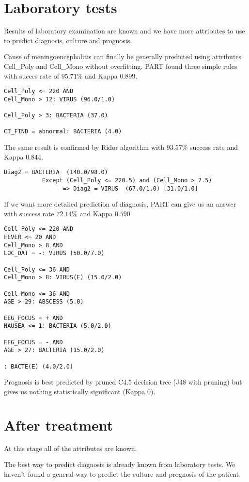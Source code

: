 \documentclass[11pt]{article}
\begin{document}
\section{Laboratory tests}
Results of laboratory examination are known and we have more attributes to use
to predict diagnosis, culture and prognosis.

Cause of meningoencephalitis can finally be generally predicted using
attributes Cell\_Poly and Cell\_Mono without overfitting. PART found three
simple rules with succes rate of $95.71\%$ and Kappa $0.899$.

\begin{verbatim}
Cell_Poly <= 220 AND
Cell_Mono > 12: VIRUS (96.0/1.0)

Cell_Poly > 3: BACTERIA (37.0)

CT_FIND = abnormal: BACTERIA (4.0)
\end{verbatim}

The same result is confirmed by Ridor algorithm with $93.57\%$ success rate and
Kappa $0.844$.
\begin{verbatim}
Diag2 = BACTERIA  (140.0/98.0)
           Except (Cell_Poly <= 220.5) and (Cell_Mono > 7.5) 
                 => Diag2 = VIRUS  (67.0/1.0) [31.0/1.0]
\end{verbatim}

If we want more detailed prediction of diagnosis, PART can give us an answer
with success rate $72.14\%$ and Kappa $0.590$.
\begin{verbatim}
Cell_Poly <= 220 AND
FEVER <= 20 AND
Cell_Mono > 8 AND
LOC_DAT = -: VIRUS (50.0/7.0)

Cell_Poly <= 36 AND
Cell_Mono > 8: VIRUS(E) (15.0/2.0)

Cell_Mono <= 36 AND
AGE > 29: ABSCESS (5.0)

EEG_FOCUS = + AND
NAUSEA <= 1: BACTERIA (5.0/2.0)

EEG_FOCUS = - AND
AGE > 27: BACTERIA (15.0/2.0)

: BACTE(E) (4.0/2.0)
\end{verbatim}

Prognosis is best predicted by pruned C4.5 decision tree (J48 with pruning) but
gives us nothing statistically significant (Kappa $0$).

\section{After treatment}
At this stage all of the attributes are known. 

The best way to predict diagnosis is already known from laboratory tests.  We
haven't found a general way to predict the culture and prognosis of the
patient.
\end{document}
